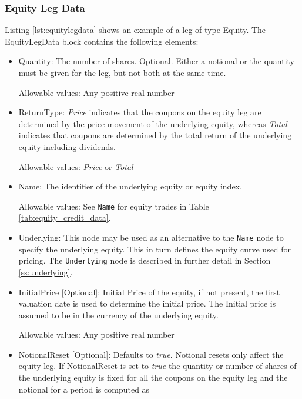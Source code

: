\subsubsection{Equity Leg Data}
\label{ss:equitylegdata}

Listing \ref{lst:equitylegdata} shows an example of a leg of type Equity. The EquityLegData block contains the following
elements:

\begin{itemize}
\item Quantity: The number of shares. Optional. Either a notional or the quantity must be given for the leg, but not
  both at the same time.

  Allowable values: Any positive real number

\item ReturnType: \emph{Price} indicates that the coupons on the equity leg are determined by the price movement of the underlying equity, whereas  \emph{Total} indicates that coupons are determined by the total return of the underlying equity including dividends.

Allowable values:  \emph{Price} or  \emph{Total}

\item Name: The identifier of the underlying equity or equity index.

Allowable values: See \lstinline!Name! for equity trades in Table \ref{tab:equity_credit_data}. \\

\item Underlying:  This node may be used as an alternative to the \lstinline!Name! node to specify the underlying equity. This in turn defines the equity curve used for pricing. The \lstinline!Underlying! node is described in further detail in Section \ref{ss:underlying}. \\

\item InitialPrice [Optional]: Initial Price of the equity, if not present, the first valuation date is used to determine the initial price. The Initial price is assumed to be in the currency of the underlying equity.

Allowable values: Any positive real number

\item NotionalReset [Optional]: Defaults to \emph{true}.  Notional resets only affect the equity leg. If NotionalReset
  is set to \emph{true} the quantity or number of shares of the underlying equity is fixed for all the coupons on the
  equity leg and the notional for a period is computed as


\end{itemize}
